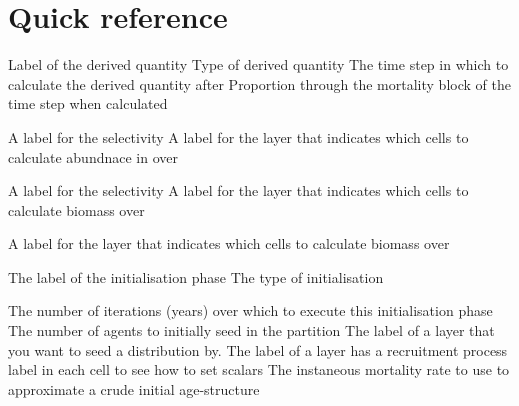 \section{Quick reference\label{sec:quick-reference}}
\par
{} {Label of the derived quantity}
 {Type of derived quantity}
 {The time step in which to calculate the derived quantity after}
 {Proportion through the mortality block of the time step when calculated}
\par\textbf{}\par
{} {A label for the selectivity}
 {A label for the layer that indicates which cells to calculate abundnace in over}
\par\textbf{}\par
{} {A label for the selectivity}
 {A label for the layer that indicates which cells to calculate biomass over}
\par\textbf{}\par
\par\textbf{}\par
{} {A label for the layer that indicates which cells to calculate biomass over}
\par\par
{} {The label of the initialisation phase}
 {The type of initialisation}
\par\textbf{}\par
{} {The number of iterations (years) over which to execute this initialisation phase}
 {The number of agents to initially seed in the partition}
 {The label of a layer that you want to seed a distribution by.}
 {The label of a layer has a recruitment process label in each cell to see how to set scalars}
 {The instaneous mortality rate to use to approximate a crude initial age-structure}
